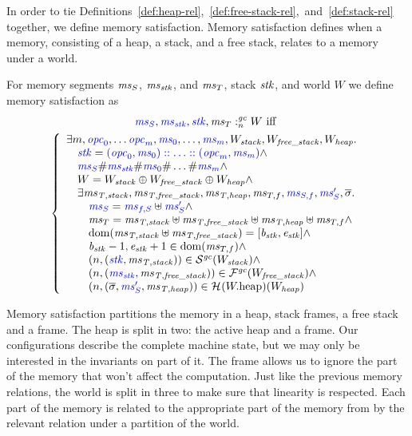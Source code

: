 \begin{jversion}
In order to tie Definitions~\ref{def:heap-rel},~\ref{def:free-stack-rel},~and~\ref{def:stack-rel} together, we define memory satisfaction.
Memory satisfaction defines when a \srccm{} memory, consisting of a heap, a stack, and a free stack, relates to a \trgcm{} memory under a world.
\begin{definition}
  For memory segments $\mathit{ms}_S$, $\mathit{ms}_{\mathit{stk}}$, and $\mathit{ms}_T$, stack $\mathit{stk}$, and world $W$ we define memory satisfaction as
  \begin{multline*}
      {\color{blue}\mathit{ms}_S},{\color{blue} \mathit{ms}_{\mathit{stk}}},{\color{blue} \mathit{stk}},\mathit{ms}_T :_{n}^{\mathit{gc}}W \text{ iff }\\
      \left\{
        \begin{array}{l}
          \exists m,  {\color{blue} \mathit{opc}_0}, \dots {\color{blue}\mathit{opc}_m}, {\color{blue} \mathit{ms}_0}, \dots, {\color{blue} \mathit{ms}_m}, W_{\mathit{stack}}, W_{\mathit{free\_stack}}, W_{\mathit{heap}} \ldotp\\
          \quad {\color{blue}\mathit{stk}} = {\color{blue} (\mathit{opc}_0,\mathit{ms}_0):: \dots :: (\mathit{opc}_m,\mathit{ms}_m)} \wedge \\
          \quad {\color{blue}\mathit{ms}_S} \# {\color{blue} \mathit{ms}_{\mathit{stk}}} \# {\color{blue} \mathit{ms}_0} \# \dots \# {\color{blue} \mathit{ms}_m} \wedge\\
          \quad W = W_{\mathit{stack}} \oplus W_{\mathit{free\_stack}} \oplus W_{\mathit{heap}} \wedge\\
          \quad\exists \mathit{ms}_{\mathit{T,stack}}, \mathit{ms}_{\mathit{T,free\_stack}}, \mathit{ms}_{\mathit{T,heap}}, \mathit{ms}_{T,f}, {\color{blue} \mathit{ms}_{S,f}}, {\color{blue} \mathit{ms}_S'},\overline{\sigma}\ldotp \\
          \qquad {\color{blue}\mathit{ms}_S} = {\color{blue} \mathit{ms}_{f,S}} \uplus {\color{blue}\mathit{ms}_S'} \wedge \\
          \qquad \mathit{ms}_T = \mathit{ms}_{\mathit{T,stack}} \uplus \mathit{ms}_{\mathit{T,free\_stack}} \uplus \mathit{ms}_{\mathit{T,heap}} \uplus \mathit{ms}_{T,f} \wedge \\
          \qquad \mathrm{dom}(\mathit{ms}_{\mathit{T,stack}} \uplus \mathit{ms}_{\mathit{T,free\_stack}}) = [\mathit{b}_{\mathit{stk}},\mathit{e}_{\mathit{stk}}] \wedge \\
          \qquad \mathit{b}_{\mathit{stk}} -1,\mathit{e}_{\mathit{stk}} + 1 \in \mathrm{dom}(\mathit{ms}_{T,f}) \wedge \\
          \qquad \left(n,({\color{blue} \mathit{stk}},\mathit{ms}_{\mathit{T,stack}})\right) \in \mathcal{S}^{\mathit{gc}}(W_{\mathit{stack}}) \wedge \\
          \qquad \left(n,({\color{blue} \mathit{ms}_{\mathit{stk}}},\mathit{ms}_{\mathit{T,free\_stack}})\right) \in \mathcal{F}^{\mathit{gc}}(W_{\mathit{free\_stack}}) \wedge \\
          \qquad \left(n,(\overline{\sigma},{\color{blue} \mathit{ms}_S'},\mathit{ms}_{\mathit{T,heap}})\right) \in \mathcal{H}^{}(W.\mathrm{heap})(W_{\mathit{heap}})
        \end{array}
      \right.
  \end{multline*}
\end{definition}
Memory satisfaction partitions the \trgcm{} memory in a heap, stack frames, a free stack and a frame.
The \srccm{} heap is split in two: the active heap and a frame.
Our configurations describe the complete machine state, but we may only be interested in the invariants on part of it.
The frame allows us to ignore the part of the memory that won't affect the computation.
Just like the previous memory relations, the world is split in three to make sure that linearity is respected.
Each part of the \srccm{} memory is related to the appropriate part of the memory from \trgcm{} by the relevant relation under a partition of the world.


\end{jversion}

